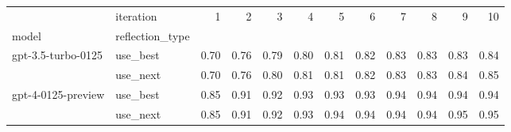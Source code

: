 \begin{tabular}{llrrrrrrrrrr}
\toprule
 & iteration & 1 & 2 & 3 & 4 & 5 & 6 & 7 & 8 & 9 & 10 \\
model & reflection_type &  &  &  &  &  &  &  &  &  &  \\
\midrule
\multirow[t]{2}{*}{gpt-3.5-turbo-0125} & use_best & 0.70 & 0.76 & 0.79 & 0.80 & 0.81 & 0.82 & 0.83 & 0.83 & 0.83 & 0.84 \\
 & use_next & 0.70 & 0.76 & 0.80 & 0.81 & 0.81 & 0.82 & 0.83 & 0.83 & 0.84 & 0.85 \\
\cline{1-12}
\multirow[t]{2}{*}{gpt-4-0125-preview} & use_best & 0.85 & 0.91 & 0.92 & 0.93 & 0.93 & 0.93 & 0.94 & 0.94 & 0.94 & 0.94 \\
 & use_next & 0.85 & 0.91 & 0.92 & 0.93 & 0.94 & 0.94 & 0.94 & 0.94 & 0.95 & 0.95 \\
\cline{1-12}
\bottomrule
\end{tabular}
